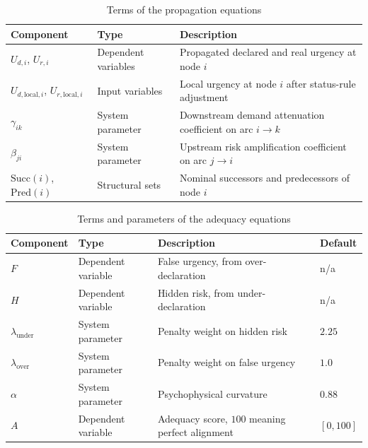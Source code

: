 \begin{table}[htbp]
\centering
\caption{Terms of the propagation equations}
\label{tab:propagation_components}
\small
\begin{tabularx}{\linewidth}{llX}
\toprule
\textbf{Component} & \textbf{Type} & \textbf{Description} \\
\midrule
$U_{d,i}$, $U_{r,i}$ & Dependent variables & Propagated declared and real urgency at node
$i$ \\
$U_{d,\text{local},i}$, $U_{r,\text{local},i}$ & Input variables & Local urgency at node
$i$ after status-rule adjustment \\
$\gamma_{ik}$ & System parameter & Downstream demand attenuation coefficient on arc
$i \to k$ \\
$\beta_{ji}$ & System parameter & Upstream risk amplification coefficient on arc
$j \to i$ \\
$\text{Succ}(i)$, $\text{Pred}(i)$ & Structural sets & Nominal successors and predecessors
of node $i$ \\
\bottomrule
\end{tabularx}
\end{table}

\begin{table}[htbp]
\centering
\caption{Terms and parameters of the adequacy equations}
\label{tab:adequation_components}
\small
\begin{tabularx}{\linewidth}{llXl}
\toprule
\textbf{Component} & \textbf{Type} & \textbf{Description} & \textbf{Default} \\
\midrule
$F$ & Dependent variable & False urgency, from over-declaration & n/a \\
$H$ & Dependent variable & Hidden risk, from under-declaration & n/a \\
$\lambda_{\text{under}}$ & System parameter & Penalty weight on hidden risk & $2.25$ \\
$\lambda_{\text{over}}$ & System parameter & Penalty weight on false urgency & $1.0$ \\
$\alpha$ & System parameter & Psychophysical curvature & $0.88$ \\
$A$ & Dependent variable & Adequacy score, $100$ meaning perfect alignment & $[0,100]$ \\
\bottomrule
\end{tabularx}
\end{table}

